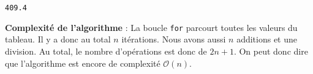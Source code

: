 \documentclass[
  a4paper,
  DIV=11,
  numbers=noendperiod]{scrartcl}
\begin{document}
\begin{verbatim}
409.4
\end{verbatim}

\textbf{Complexité de l'algorithme} : La boucle \texttt{for} parcourt
toutes les valeurs du tableau. Il y a donc au total \(n\) itérations.
Nous avons aussi \(n\) additions et une division. Au total, le nombre
d'opérations est donc de \(2n+1\). On peut donc dire que l'algorithme
est encore de complexité \(\mathcal{O}(n)\).
\end{document}
